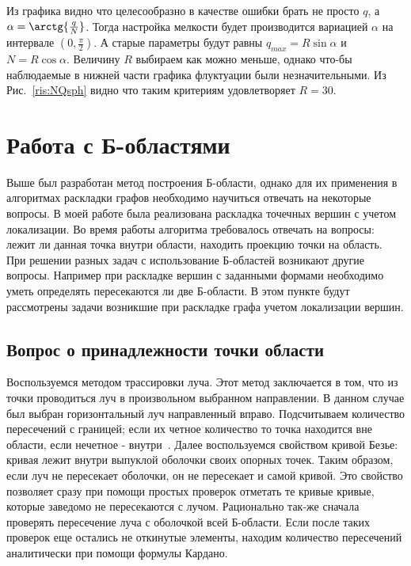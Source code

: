\documentclass[a4paper,12pt]{report}
\begin{document}
Из графика видно что целесообразно в качестве ошибки брать не просто $q$, а $\alpha=\arctg{\frac{q}{N}}$. Тогда настройка мелкости будет производится вариацией $\alpha$ на интервале $(0,\frac{\pi}{2})$. А старые параметры будут равны $q_{max}=R\sin{\alpha}$ и $N=R\cos{\alpha}$. Величину $R$ выбираем как можно меньше, однако что-бы наблюдаемые в нижней части графика флуктуации были незначительными. Из  Рис.~\ref{ris:NQsph} видно что таким критериям удовлетворяет $R=30$.

\section{Работа с Б-областями}\label{sec:methods}

Выше был разработан метод построения Б-области, однако для их применения в алгоритмах раскладки графов необходимо научиться отвечать на некоторые вопросы. В моей работе была реализована раскладка точечных вершин с учетом локализации. Во время работы алгоритма требовалось отвечать на вопросы: лежит ли данная точка внутри области, находить проекцию точки на область. При решении разных задач с использование Б-областей возникают другие вопросы. Например при раскладке вершин с заданными формами необходимо уметь определять пересекаются ли две Б-области. В этом пункте будут рассмотрены задачи возникшие при раскладке графа учетом локализации вершин.

\subsection{Вопрос о принадлежности точки области}

Воспользуемся методом трассировки луча. Этот метод заключается в том, что из точки проводиться луч в произвольном выбранном направлении. В данном случае был выбран горизонтальный луч направленный вправо. Подсчитываем количество пересечений с границей; если их четное количество то точка находится вне области, если нечетное - внутри~\cite{bezier}. Далее воспользуемся свойством кривой Безье: кривая лежит внутри выпуклой оболочки своих опорных точек. Таким образом, если луч не пересекает оболочки, он не пересекает и самой кривой.  Это свойство позволяет сразу при помощи простых проверок отметать те кривые кривые, которые заведомо не пересекаются с лучом. Рационально так-же сначала проверять пересечение луча с оболочкой всей Б-области. Если после таких проверок еще остались не откинутые элементы, находим количество пересечений аналитически при помощи формулы Кардано.
\end{document}
